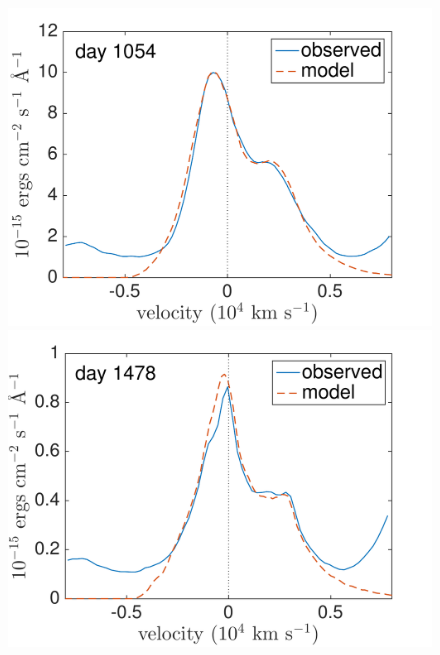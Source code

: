 \begin{figure}
\includegraphics[trim =0 35 0 0,clip=true,scale=0.37]{chapters/chapter5/images/clump_1/best_fit/d1054OI.pdf}
\hspace{0mm}
\includegraphics[trim =0 35 0 0,clip=true,scale=0.37]{chapters/chapter5/images/clump_1/best_fit/d1478OI.pdf}


\end{figure}
